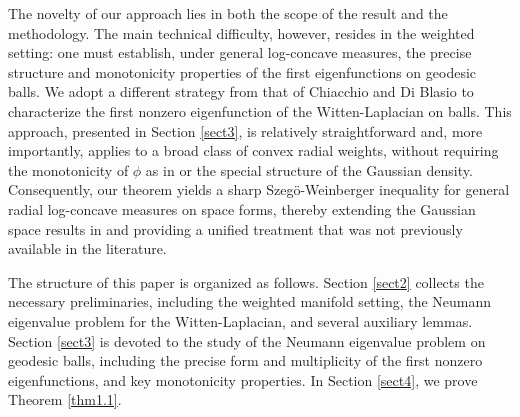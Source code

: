 \documentclass[11pt,leqno]{amsart}
\numberwithin{equation}{section}
\begin{document}
The novelty of our approach lies in both the scope of the result and the methodology.  The main technical difficulty, however, resides in the weighted setting: one must establish, under general log-concave measures, the precise structure and monotonicity properties of the first eigenfunctions on geodesic balls.  We adopt a different strategy from that of Chiacchio and Di Blasio \cite{CB12}  to characterize the first nonzero eigenfunction of the Witten-Laplacian on balls. This approach, presented in Section \ref{sect3}, is relatively straightforward and, more importantly, applies to a broad class of convex radial weights, without requiring the monotonicity of $\phi$ as in \cite{CM24}
  or the special structure of the Gaussian density.  Consequently, our theorem yields a sharp Szeg\"o-Weinberger   inequality for general radial log-concave measures on space forms, thereby extending the Gaussian space results in \cite{Fr26, GW26} and providing a unified treatment that was not previously available in the literature.

The structure of this paper is organized as follows. Section \ref{sect2} collects the necessary preliminaries, including the weighted manifold setting, the Neumann eigenvalue problem for the Witten-Laplacian, and several auxiliary lemmas.  Section \ref{sect3}
is devoted to the study of the Neumann eigenvalue problem on geodesic balls, including the precise form and multiplicity of the first nonzero eigenfunctions, and  key monotonicity properties. In Section  \ref{sect4}, we prove Theorem \ref{thm1.1}.
\end{document}
